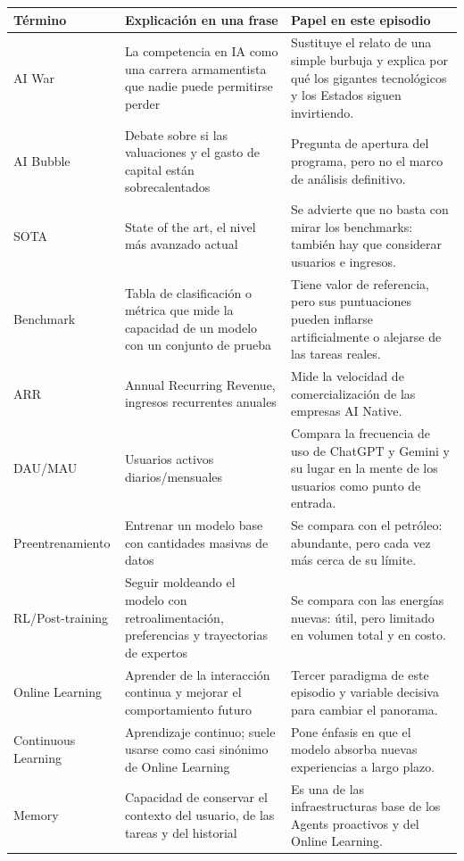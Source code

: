 \documentclass[a4paper]{article}
\begin{document}
\begin{longtable}{p{}p{}p{}}
\toprule
Término & Explicación en una frase & Papel en este episodio \\
\midrule
AI War & La competencia en IA como una carrera armamentista que nadie puede permitirse perder & Sustituye el relato de una simple burbuja y explica por qué los gigantes tecnológicos y los Estados siguen invirtiendo. \\
AI Bubble & Debate sobre si las valuaciones y el gasto de capital están sobrecalentados & Pregunta de apertura del programa, pero no el marco de análisis definitivo. \\
SOTA & State of the art, el nivel más avanzado actual & Se advierte que no basta con mirar los benchmarks: también hay que considerar usuarios e ingresos. \\
Benchmark & Tabla de clasificación o métrica que mide la capacidad de un modelo con un conjunto de prueba & Tiene valor de referencia, pero sus puntuaciones pueden inflarse artificialmente o alejarse de las tareas reales. \\
ARR & Annual Recurring Revenue, ingresos recurrentes anuales & Mide la velocidad de comercialización de las empresas AI Native. \\
DAU/MAU & Usuarios activos diarios/mensuales & Compara la frecuencia de uso de ChatGPT y Gemini y su lugar en la mente de los usuarios como punto de entrada. \\
Preentrenamiento & Entrenar un modelo base con cantidades masivas de datos & Se compara con el petróleo: abundante, pero cada vez más cerca de su límite. \\
RL/Post-training & Seguir moldeando el modelo con retroalimentación, preferencias y trayectorias de expertos & Se compara con las energías nuevas: útil, pero limitado en volumen total y en costo. \\
Online Learning & Aprender de la interacción continua y mejorar el comportamiento futuro & Tercer paradigma de este episodio y variable decisiva para cambiar el panorama. \\
Continuous Learning & Aprendizaje continuo; suele usarse como casi sinónimo de Online Learning & Pone énfasis en que el modelo absorba nuevas experiencias a largo plazo. \\
Memory & Capacidad de conservar el contexto del usuario, de las tareas y del historial & Es una de las infraestructuras base de los Agents proactivos y del Online Learning. \\

\end{longtable}
\end{document}
